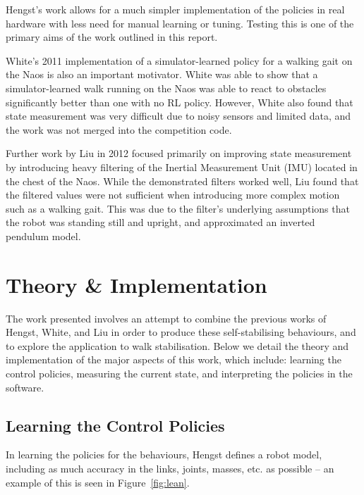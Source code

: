 Hengst's work allows for a much simpler implementation of the policies in real hardware with less need for manual learning or tuning. Testing this is one of the primary aims of the work outlined in this report.

White's\cite{white} 2011 implementation of a simulator-learned policy for a walking gait on the Naos is also an important motivator. White was able to show that a simulator-learned walk running on the Naos was able to react to obstacles significantly better than one with no RL policy. However, White also found that state measurement was very difficult due to noisy sensors and limited data, and the work was not merged into the competition code.

Further work by Liu\cite{liu} in 2012 focused primarily on improving state measurement by introducing heavy filtering of the Inertial Measurement Unit (IMU) located in the chest of the Naos. While the demonstrated filters worked well, Liu found that the filtered values were not sufficient when introducing more complex motion such as a walking gait. This was due to the filter's underlying assumptions that the robot was standing still and upright, and approximated an inverted pendulum model.

\newpage
\section{Theory \& Implementation}

The work presented involves an attempt to combine the previous works of Hengst, White, and Liu in order to produce these self-stabilising behaviours, and to explore the application to walk stabilisation. Below we detail the theory and implementation of the major aspects of this work, which include: learning the control policies, measuring the current state, and interpreting the policies in the software.

\subsection{Learning the Control Policies}
\label{sec:learning_policies}
In learning the policies for the behaviours, Hengst\cite{bernhard_rl} defines a robot model, including as much accuracy in the links, joints, masses, etc. as possible -- an example of this is seen in Figure~\ref{fig:lean}.

